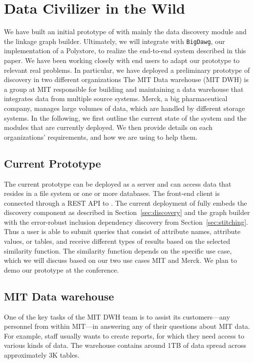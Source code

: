\section{Data Civilizer in the Wild}
\label{sec:wild}

We have built an initial prototype of \dcv with mainly the data discovery module and the linkage graph builder. 
Ultimately, we will integrate \dcv with \texttt{BigDawg}, our implementation of a Polystore, to realize the end-to-end system described in this paper. 
We have been working closely with end users to adapt our prototype to relevant real problems. 
In particular, we have deployed a preliminary prototype of discovery in two different organizations 
The MIT Data warehouse (MIT DWH) is a group at MIT responsible for building and maintaining a data warehouse that integrates data from multiple source systems. Merck, a big pharmaceutical company, manages large volumes of data, which are handled by different storage systems. 
In the following, we first outline the current state of the system and the modules that are currently deployed.
We then provide details on each organizations' requirements, and how we are using \dcv to help them.

\subsection{Current \titledcv Prototype}
The current prototype can be deployed as a server and can access data that resides in a file system or one or more databases.
The front-end client is connected through a REST API to \dcv.
The current deployment of \dcv fully embeds the discovery component as described in Section~\ref{sec:discovery} and the graph builder with the error-robust inclusion dependency discovery from Section~\ref{sec:stitching}. 
Thus a user is able to submit queries that consist of attribute names, attribute values, or tables, and receive different types of results based on the selected similarity function. The similarity function depends on the specific use case, which we will discuss based on our two use cases MIT and Merck.
We plan to demo our \dcv prototype at the conference.

\subsection{MIT Data warehouse}


One of the key tasks of the MIT DWH team is to assist its customers—any personnel from within MIT—in answering any of their questions about MIT data. For example, staff usually wants to create reports, for which they need access to various kinds of data. The warehouse contains around 1TB of data spread across approximately 3K tables.

